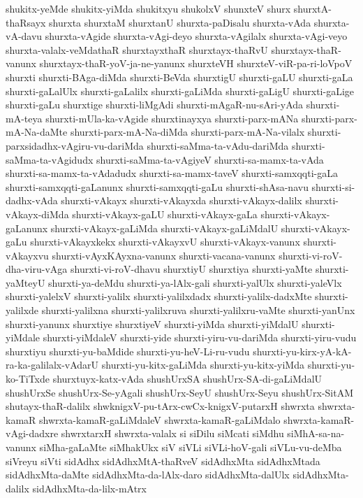 {shukitx-yeMde
shukitx-yiMda
shukitxyu
shukolxV
shunxteV
shurx
shurxtA-thaRsayx
shurxta
shurxtaM
shurxtanU
shurxta-paDisalu
shurxta-vAda
shurxta-vA-davu
shurxta-vAgide
shurxta-vAgi-deyo
shurxta-vAgilalx
shurxta-vAgi-veyo
shurxta-valalx-veMdathaR
shurxtayxthaR
shurxtayx-thaRvU
shurxtayx-thaR-vanunx
shurxtayx-thaR-yoV-ja-ne-yanunx
shurxteVH
shurxteV-viR-pa-ri-loVpoV
shurxti
shurxti-BAga-diMda
shurxti-BeVda
shurxtigU
shurxti-gaLU
shurxti-gaLa
shurxti-gaLalUlx
shurxti-gaLalilx
shurxti-gaLiMda
shurxti-gaLigU
shurxti-gaLige
shurxti-gaLu
shurxtige
shurxti-liMgAdi
shurxti-mAgaR-nu-sAri-yAda
shurxti-mA-teya
shurxti-mUla-ka-vAgide
shurxtinayxya
shurxti-parx-mANa
shurxti-parx-mA-Na-daMte
shurxti-parx-mA-Na-diMda
shurxti-parx-mA-Na-vilalx
shurxti-parxsidadhx-vAgiru-vu-dariMda
shurxti-saMma-ta-vAdu-dariMda
shurxti-saMma-ta-vAgidudx
shurxti-saMma-ta-vAgiyeV
shurxti-sa-mamx-ta-vAda
shurxti-sa-mamx-ta-vAdadudx
shurxti-sa-mamx-taveV
shurxti-samxqqti-gaLa
shurxti-samxqqti-gaLanunx
shurxti-samxqqti-gaLu
shurxti-shAsa-navu
shurxti-si-dadhx-vAda
shurxti-vAkayx
shurxti-vAkayxda
shurxti-vAkayx-dalilx
shurxti-vAkayx-diMda
shurxti-vAkayx-gaLU
shurxti-vAkayx-gaLa
shurxti-vAkayx-gaLanunx
shurxti-vAkayx-gaLiMda
shurxti-vAkayx-gaLiMdalU
shurxti-vAkayx-gaLu
shurxti-vAkayxkekx
shurxti-vAkayxvU
shurxti-vAkayx-vanunx
shurxti-vAkayxvu
shurxti-vAyxKAyxna-vanunx
shurxti-vacana-vanunx
shurxti-vi-roV-dha-viru-vAga
shurxti-vi-roV-dhavu
shurxtiyU
shurxtiya
shurxti-yaMte
shurxti-yaMteyU
shurxti-ya-deMdu
shurxti-ya-lAlx-gali
shurxti-yalUlx
shurxti-yaleVlx
shurxti-yalelxV
shurxti-yalilx
shurxti-yalilxdadx
shurxti-yalilx-dadxMte
shurxti-yalilxde
shurxti-yalilxna
shurxti-yalilxruva
shurxti-yalilxru-vaMte
shurxti-yanUnx
shurxti-yanunx
shurxtiye
shurxtiyeV
shurxti-yiMda
shurxti-yiMdalU
shurxti-yiMdale
shurxti-yiMdaleV
shurxti-yide
shurxti-yiru-vu-dariMda
shurxti-yiru-vudu
shurxtiyu
shurxti-yu-baMdide
shurxti-yu-heV-Li-ru-vudu
shurxti-yu-kirx-yA-kA-ra-ka-galilalx-vAdarU
shurxti-yu-kitx-gaLiMda
shurxti-yu-kitx-yiMda
shurxti-yu-ko-TiTxde
shurxtuyx-katx-vAda
shushUrxSA
shushUrx-SA-di-gaLiMdalU
shushUrxSe
shushUrx-Se-yAgali
shushUrx-SeyU
shushUrx-Seyu
shushUrx-SitAM
shutayx-thaR-dalilx
shwknigxV-pu-tArx-cwCx-knigxV-putarxH
shwrxta
shwrxta-kamaR
shwrxta-kamaR-gaLiMdaleV
shwrxta-kamaR-gaLiMdalo
shwrxta-kamaR-vAgi-dadxre
shwrxtarxH
shwrxta-valalx
si
siDilu
siMcati
siMdhu
siMhA-sa-na-vanunx
siMha-gaLaMte
siMhakUkx
siV
siVLi
siVLi-hoV-gali
siVLu-vu-deMba
siVreyu
siVti
sidAdhx
sidAdhxMtA-thaRveV
sidAdhxMta
sidAdhxMtada
sidAdhxMta-daMte
sidAdhxMta-da-lAlx-daro
sidAdhxMta-dalUlx
sidAdhxMta-dalilx
sidAdhxMta-da-lilx-mAtrx
}
